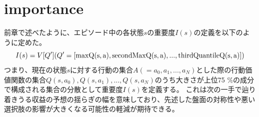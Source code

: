\section{importance}
前章で述べたように、エピソード中の各状態$s$の重要度$I(s)$の定義を以下のように定めた。
\begin{equation}
	{I(s)=V[Q'] (Q'=[\rm{max}Q(s, a), \rm{secondMax}Q(s, a), ..., \rm{thirdQuantile}Q(s, a)])}
\end{equation}
つまり、現在の状態$s$に対する行動の集合$A(={a_0, a_1, ..., a_N})$とした際の行動価値関数の集合${Q(s, a_0), Q(s, a_1), ..., Q(s, a_N)}$のうち大きさが上位75
\%の成分で構成される集合の分散として重要度$I(s)$を定義する。
これは次の一手で辿り着きうる収益の予想の揺らぎの幅を意味しており、先述した盤面の対称性や悪い選択肢の影響が大きくなる可能性の軽減が期待できる。

